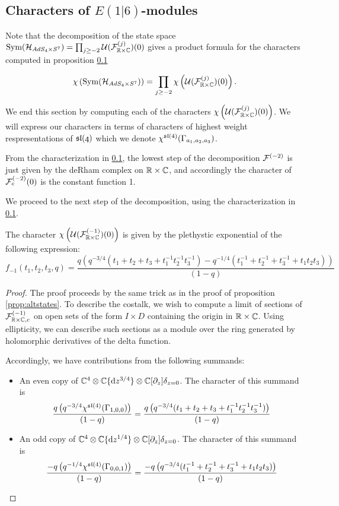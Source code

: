 \subsection{Characters of $E(1|6)$-modules}
Note that the decomposition of the state space $\text{Sym} (\mathcal{H}_{AdS_4\times S^7} ) = \prod_{j\geq -2} \mathcal{U} (\mathcal{F}^{(j)} _{\mathbb{R}\times \mathbb{C}} )(0)$ gives a product formula for the characters computed in proposition \ref{} 

\[\chi \left (\text{Sym} (\mathcal{H}_{AdS_4\times S^7} ) \right )= \prod_{j\geq -2} \chi \left ( \mathcal{U} (\mathcal{F}^{(j)} _{\mathbb{R}\times \mathbb{C}} )(0)\right ).\]

We end this section by computing each of the characters $\chi \left ( \mathcal{U} (\mathcal{F}^{(j)} _{\mathbb{R}\times \mathbb{C}} )(0)\right )$. We will express our characters in terms of characters of highest weight respresentations of $\mathfrak{sl(4)}$ which we denote $\chi^{\mathfrak{sl}(4)}(\Gamma_{a_1,a_2, a_3} )$.

\parsec[]
From the characterization in \ref{}, the lowest step of the decomposition $\mathcal{F}^{(-2)}$ is just given by the deRham complex on $\mathbb{R}\times \mathbb{C}$, and accordingly the character of $\mathcal{F}^{(-2)}_{c}(0)$ is the constant function 1.

\parsec[]
We proceed to the next step of the decomposition, using the characterization in \ref{}.

\begin{prop}
The character $\chi \left ( \mathcal{U}(\mathcal{F}_{\mathbb{R}\times \mathbb{C}}^{(-1)})(0)\right )$ is given by the plethystic exponential of the following expression:
\begin{equation}
f_{-1}(t_1, t_2, t_3, q) = \frac{q\left (q^{-3/4}(t_1+ t_2+t_3 + t_1^{-1} t_2^{-1} t_3^{-1} )-q^{-1/4}(t_1^{-1} + t_2^{-1}+t_3^{-1} + t_1t_2t_3)\right )}{(1-q)}
\end{equation}
\end{prop}
\begin{proof}
The proof proceeds by the same trick as in the proof of proposition \ref{prop:altstates}. To describe the costalk, we wish to compute a limit of sections of $\mathcal{F}^{(-1)}_{\mathbb{R}\times \mathbb{C},c}$ on open sets of the form $I\times D$ containing the origin in $\mathbb{R}\times \mathbb{C}$. Using ellipticity, we can describe such sections as a module over the ring generated by holomorphic derivatives of the delta function. 

Accordingly, we have contributions from the following summands:
\begin{itemize}
\item An even copy of $\mathbb{C}^4\otimes \mathbb{C}\{\mathrm{d} z^{3/4}\} \otimes \mathbb{C}[\partial_z]\delta_{z=0}$. The character of this summand is
\[
\frac{q\left (q^{-3/4}\chi^{\mathfrak{sl}(4)}(\Gamma_{1,0,0}) \right )}{(1-q)} =\frac{q\left (q^{-3/4}(t_1+ t_2+t_3 + t_1^{-1} t_2^{-1} t_3^{-1} )\right )}{(1-q)}
\]
\item An odd copy of $\mathbb{C}^4\otimes \mathbb{C}\{\mathrm{d} z^{1/4}\} \otimes \mathbb{C}[\partial_z]\delta_{z=0}$. The character of this summand is
\[
\frac{-q\left (q^{-1/4}\chi^{\mathfrak{sl}(4)}(\Gamma_{0,0,1}) \right )}{(1-q)} =\frac{-q\left (q^{-3/4}(t_1^{-1} + t_2^{-1} +t_3^{-1}  + t_1 t_2 t_3)\right )}{(1-q)}
\]
\end{itemize}
\end{proof}

